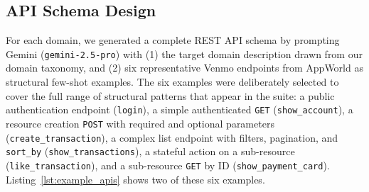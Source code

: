 \documentclass[11pt]{article}
\begin{document}
\subsection{API Schema Design}

For each domain, we generated a complete REST API schema by prompting Gemini (\texttt{gemini-2.5-pro}) with (1) the target domain description drawn from our domain taxonomy, and (2) six representative Venmo endpoints from AppWorld as structural few-shot examples. The six examples were deliberately selected to cover the full range of structural patterns that appear in the suite: a public authentication endpoint (\texttt{login}), a simple authenticated \texttt{GET} (\texttt{show\_account}), a resource creation \texttt{POST} with required and optional parameters (\texttt{create\_transaction}), a complex list endpoint with filters, pagination, and \texttt{sort\_by} (\texttt{show\_transactions}), a stateful action on a sub-resource (\texttt{like\_transaction}), and a sub-resource \texttt{GET} by ID (\texttt{show\_payment\_card}). Listing~\ref{lst:example_apis} shows two of these six examples.
\end{document}

